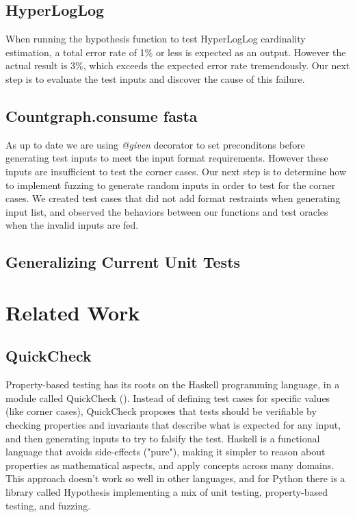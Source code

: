 \documentclass[preprint,nocopyrightspace]{sig-alternate}
\begin{document}
\subsection{HyperLogLog}

When running the hypothesis function to test HyperLogLog cardinality estimation,
a total error rate of 1\% or less is expected as an output.
However the actual result is 3\%,
which exceeds the expected error rate tremendously.
Our next step is to evaluate the test inputs and discover the cause of this failure.

\subsection{Countgraph.consume fasta}

As up to date we are using \emph{@given} decorator to set preconditons before generating test inputs to meet the input format requirements.
However these inputs are insufficient to test the corner cases.
Our next step is to determine how to implement fuzzing to generate random inputs in order to test for the corner cases.
We created test cases that did not add format restraints when generating input list,
and observed the behaviors between our functions and test oracles when the invalid inputs are fed.

\subsection{Generalizing Current Unit Tests}


\section{Related Work}

\subsection{QuickCheck}
Property-based testing has its roots on the Haskell programming language,
in a module called QuickCheck (\citet{claessen_quickcheck:_2011}).
Instead of defining test cases for specific values (like corner cases),
QuickCheck proposes that tests should be verifiable by checking properties and invariants that describe what is expected for any input,
and then generating inputs to try to falsify the test.
Haskell is a functional language that avoids side-effects ("pure"),
making it simpler to reason about properties as mathematical aspects,
and apply concepts across many domains.
This approach doesn't work so well in other languages,
and for Python there is a library called Hypothesis implementing a mix of unit testing,
property-based testing,
and fuzzing.
\end{document}

